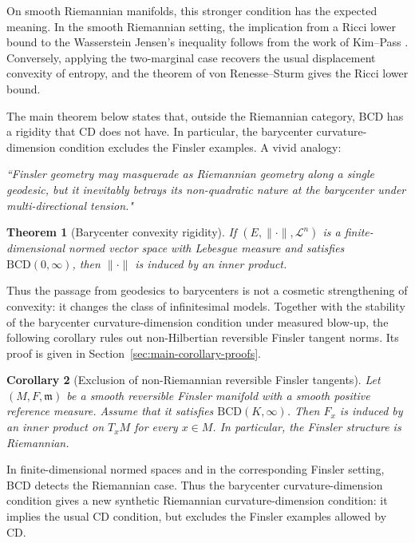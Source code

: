 \documentclass[10pt,a4paper]{amsart}
\numberwithin{equation}{section}
\newtheorem{theorem}{Theorem}[section]
\newtheorem{corollary}[theorem]{Corollary}
\begin{document}
	
	
	On smooth Riemannian manifolds, this stronger condition has the expected meaning. In the smooth Riemannian setting, the implication from a Ricci lower bound to the Wasserstein Jensen's inequality follows from the work of Kim--Pass \cite{KimPass}. Conversely, applying the two-marginal case recovers the usual displacement convexity of entropy, and the theorem of von Renesse--Sturm \cite{vRenesseSturm} gives the Ricci lower bound.
	
	\medskip
	
	The main theorem below states that, outside the Riemannian category, BCD has a rigidity that CD does not have. In particular, the barycenter curvature-dimension condition excludes the Finsler examples.  A vivid analogy:
	\begin{center}
	\emph{``Finsler geometry may masquerade as Riemannian geometry along a single geodesic, but it inevitably betrays its non-quadratic nature at the barycenter under multi-directional tension."}
	\end{center}
	

	\begin{theorem}[Barycenter convexity rigidity]\label{thm:main-intro}
		If \((E,\|\cdot\|,\mathcal L^n)\) is a finite-dimensional normed vector space with Lebesgue measure and satisfies \(\mathrm{BCD}(0,\infty)\), then \(\|\cdot\|\) is induced by an inner product.
	\end{theorem}

	
	
	
	Thus the passage from geodesics to barycenters is not a cosmetic
strengthening of convexity: it changes the class of infinitesimal models. Together with the stability of the barycenter curvature-dimension condition under measured blow-up, the following corollary rules out non-Hilbertian reversible Finsler tangent norms. Its proof is given in Section~\ref{sec:main-corollary-proofs}.
	
	\begin{corollary}[Exclusion of non-Riemannian reversible Finsler tangents]
		\label{cor:finsler-exclusion}
		Let \((M,F,\mathfrak m)\) be a smooth reversible Finsler manifold with a smooth positive
		reference measure. Assume that it satisfies \(\mathrm{BCD}(K,\infty)\). Then \(F_x\) is induced by an inner product on \(T_xM\) for every \(x\in M\).
		In particular, the Finsler structure is Riemannian.
	\end{corollary}
	

	
	In finite-dimensional normed spaces and in the corresponding Finsler setting, BCD detects the Riemannian case.
	Thus the barycenter curvature-dimension condition gives  a new synthetic Riemannian curvature-dimension condition: it implies the usual CD condition, but excludes the Finsler examples allowed by CD.
	
\end{document}
